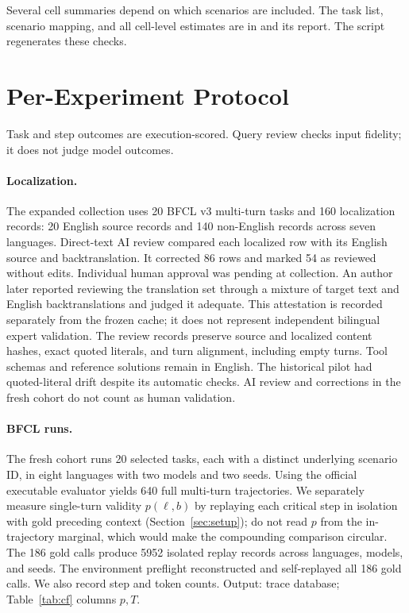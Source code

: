 \documentclass[11pt]{article}
\begin{document}
Several cell summaries depend on which scenarios are included. The task
list, scenario mapping, and all cell-level estimates are in
and its report. The script 
regenerates these checks.

\section{Per-Experiment Protocol}
\label{app:protocol}
Task and step outcomes are execution-scored. Query review checks input
fidelity; it does not judge model outcomes.

\paragraph{Localization.} The expanded collection uses 20 BFCL v3 multi-turn
tasks and 160 localization records: 20 English source records and 140
non-English records across seven languages. Direct-text AI review compared
each localized row with its English source and backtranslation. It corrected
86 rows and marked 54 as reviewed without edits. Individual human approval
was pending at collection. An author later reported reviewing the translation
set through a mixture of target text and English backtranslations and judged
it adequate. This attestation is recorded separately from the frozen cache;
it does not represent independent bilingual expert validation.
The review records preserve source and localized
content hashes, exact quoted literals, and turn alignment, including empty
turns. Tool schemas and reference solutions remain in English. The historical pilot
had quoted-literal drift despite its automatic checks. AI review and
corrections in the fresh cohort do not count as human validation.

\paragraph{BFCL runs.} The fresh cohort runs 20 selected tasks, each with a
distinct underlying scenario ID, in eight languages with two models and two
seeds. Using the official executable evaluator yields 640 full multi-turn
trajectories. We separately measure single-turn validity $p(\ell,b)$ by
replaying each critical step in isolation with gold preceding context
(Section~\ref{sec:setup}); do not read $p$ from the in-trajectory marginal,
which would make the compounding comparison circular. The 186 gold calls
produce 5952 isolated replay records across languages, models, and seeds.
The environment preflight reconstructed and self-replayed all 186 gold calls.
We also record step and token counts. Output: trace database;
Table~\ref{tab:cf} columns $p,T$.
\end{document}
